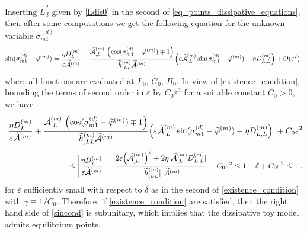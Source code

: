 \documentclass[12pt,reqno]{amsart}
\numberwithin{equation}{section}
\def\A{{\mathcal A}}
\begin{document}
 Inserting $\widetilde{L}_{d}^\sigma$ given by \eqref{Ldis0} in the second of \eqref{eq_points_dissipative_equations}, then after some computations we get the following equation for the unknown variable $\sigma_{m1}^{(d)}$
 \begin{equation} \label{sincond}
 \sin (\sigma_{m1}^{(d)}-\widetilde{\varphi}^{(m)}) =\frac{\eta D_L^{(m)}}{\varepsilon \widetilde{\A}^{(m)}}+ \frac{\widetilde{\A}_{,L}^{(m)} \ \Bigl(\cos (\sigma_{m1}^{(d)}-\widetilde{\varphi}^{(m)}) \mp 1\Bigr)}{ \widetilde{h}_{,LL}^{(m)} \widetilde{\A}^{(m)}} \Bigl( \varepsilon \widetilde{\A}_{,L}^{(m)} \sin (\sigma_{m1}^{(d)}-\widetilde{\varphi}^{(m)})-\eta D_{L,L}^{(m)} \Bigr) +O(\varepsilon^2)\,,
 \end{equation}
 where all functions are evaluated at $\widetilde{L}_0$, $\widetilde{G}_0$, $\widetilde{H}_0$. In view of \eqref{existence_condition},
bounding the terms of second order in $\varepsilon$ by $C_0\varepsilon^2$ for a suitable constant
$C_0>0$, we have
$$
\Bigl| \frac{\eta D_L^{(m)}}{\varepsilon \widetilde{\A}^{(m)}}+ \frac{\widetilde{\A}_{,L}^{(m)} \ \Bigl(\cos (\sigma_{m1}^{(d)}-\widetilde{\varphi}^{(m)}) \mp 1\Bigr)}{ \widetilde{h}_{,LL}^{(m)} \widetilde{\A}^{(m)}} \Bigl( \varepsilon \widetilde{\A}_{,L}^{(m)} \sin (\sigma_{m1}^{(d)}-\widetilde{\varphi}^{(m)})-\eta D_{L,L}^{(m)} \Bigr)\Bigr| +C_0\varepsilon^2$$
  $$\hspace{3cm} \leq \left| \frac{\eta D^{(m)}_{_L} }{\varepsilon
\widetilde{\mathcal{A}}^{(m)}} \right| +  \frac{  2 \varepsilon \Bigl(\widetilde{\A}_{,L}^{(m)}\Bigr)^2 +2
 \eta |\widetilde{\A}_{,L}^{(m)}  D_{L,L}^{(m)}|}{ |\widetilde{h}_{,LL}^{(m)}| \  \widetilde{\A}^{(m)}}
 +C_0\varepsilon^2 \leq 1-\delta+C_0 \varepsilon^2 \leq 1\ ,
$$
for $\varepsilon$ sufficiently small with respect to $\delta$ as in the second of \eqref{existence_condition} with $\gamma \equiv 1/C_0$.  Therefore, if
\eqref{existence_condition} are satisfied, then the right hand side of \eqref{sincond} is subunitary,
which implies that the dissipative toy model admits equilibrium points.
\end{document}
